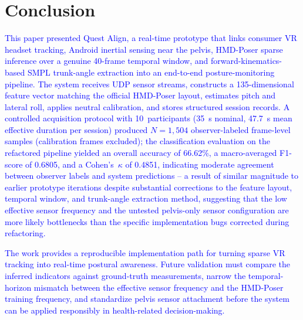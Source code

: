 \documentclass[conference]{IEEEtran}
\newcommand{\CC}[1]{\textcolor{blue}{#1}}
\begin{document}
\section{Conclusion}
\CC{This paper presented Quest Align, a real-time prototype that links consumer VR headset
tracking, Android inertial sensing near the pelvis, HMD-Poser sparse inference over a
genuine 40-frame temporal window, and forward-kinematics-based SMPL trunk-angle extraction
into an end-to-end posture-monitoring pipeline. The system receives UDP sensor streams,
constructs a 135-dimensional feature vector matching the official HMD-Poser layout,
estimates pitch and lateral roll, applies neutral calibration, and stores structured session
records. A controlled acquisition protocol with 10~participants (35~s nominal, 47.7~s mean
effective duration per session) produced $N=1{,}504$ observer-labeled frame-level samples (calibration frames excluded);
the classification evaluation on the refactored pipeline yielded an overall accuracy of
66.62\%, a macro-averaged F1-score of 0.6805, and a Cohen's~$\kappa$ of 0.4851, indicating
moderate agreement between observer labels and system predictions -- a result of similar
magnitude to earlier prototype iterations despite substantial corrections to the feature
layout, temporal window, and trunk-angle extraction method, suggesting that the low
effective sensor frequency and the untested pelvis-only sensor configuration are more
likely bottlenecks than the specific implementation bugs corrected during refactoring.

The work provides a reproducible implementation path for turning sparse VR tracking into
real-time postural awareness. Future validation must compare the inferred indicators
against ground-truth measurements, narrow the temporal-horizon mismatch between the
effective sensor frequency and the HMD-Poser training frequency, and standardize pelvis
sensor attachment before the system can be applied responsibly in health-related
decision-making.}
\end{document}
